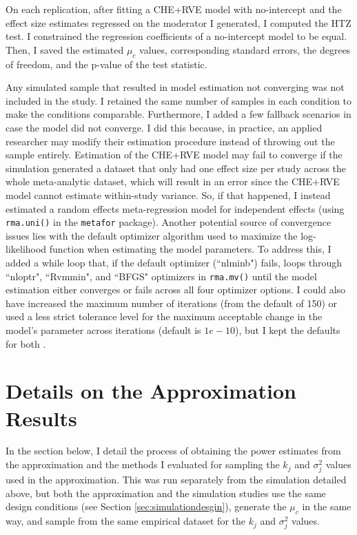 On each replication, after fitting a CHE+RVE model with no-intercept and the effect size estimates regressed on the moderator I generated, I computed the HTZ test. I constrained the regression coefficients of a no-intercept model to be equal. Then, I saved the estimated $\mu_c$ values, corresponding standard errors, the degrees of freedom, and the p-value of the test statistic. 

Any simulated sample that resulted in model estimation not converging was not included in the study. I retained the same number of samples in each condition to make the conditions comparable. Furthermore, I added a few fallback scenarios in case the model did not converge. I did this because, in practice, an applied researcher may modify their estimation procedure instead of throwing out the sample entirely. Estimation of the CHE+RVE model may fail to converge if the simulation generated a dataset that only had one effect size per study across the whole meta-analytic dataset, which will result in an error since the CHE+RVE model cannot estimate within-study variance. So, if that happened, I instead estimated a random effects meta-regression model for independent effects (using \texttt{rma.uni()} in the \texttt{metafor} package). Another potential source of convergence issues lies with the default optimizer algorithm used to maximize the log-likelihood function when estimating the model parameters. To address this, I added a while loop that, if the default optimizer (``nlminb") fails, loops through ``nloptr", ``Rvmmin", and ``BFGS" optimizers in \texttt{rma.mv()} until the model estimation either converges or fails across all four optimizer options. I could also have increased the maximum number of iterations (from the default of 150) or used a less strict tolerance level for the maximum acceptable change in the model's parameter across iterations (default is $1e-10$), but I kept the defaults for both \autocite{viechtbauer_convergence_2022}. 

\section{Details on the Approximation Results}

In the section below, I detail the process of obtaining the power estimates from the approximation and the methods I evaluated for sampling the $k_j$ and $\sigma_j^2$ values used in the approximation. This was run separately from the simulation detailed above, but both the approximation and the simulation studies use the same design conditions (see Section \ref{sec:simulationdesgin}), generate the $\mu_c$ in the same way, and sample from the same empirical dataset \autocite{WilliamsRyan2022HiMI} for the $k_j$ and $\sigma_j^2$ values. 

